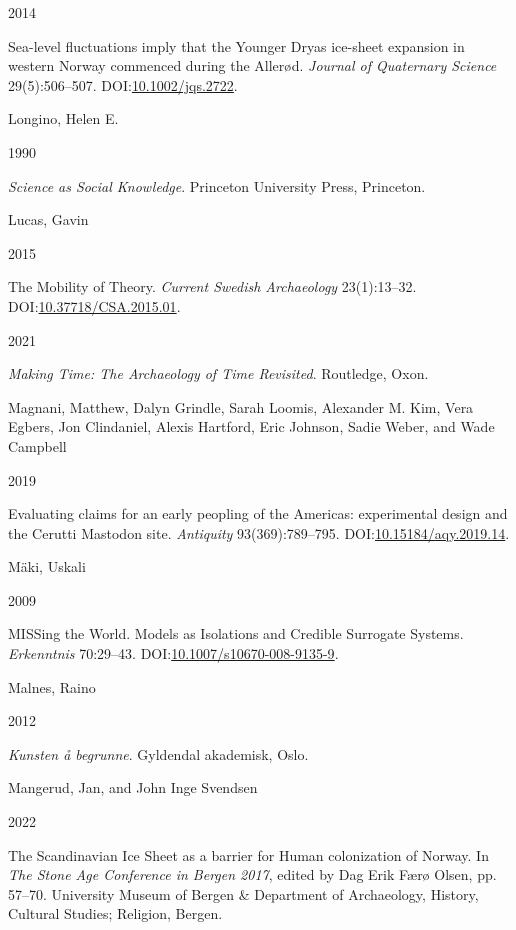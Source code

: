 \documentclass[
  12pt,
  a4paper,
  oneside]{book}
\newlength{\cslhangindent}
\newlength{\csllabelwidth}
\newlength{\cslentryspacingunit} %
\newenvironment{CSLReferences}[2] %
 {%
  \setlength{\parindent}{0pt}
  \ifodd #1
  \let\oldpar\par
  \def\par{\hangindent=\cslhangindent\oldpar}
  \fi
  \setlength{\parskip}{#2\cslentryspacingunit}
 }%
 {}
\newcommand{\CSLBlock}[1]{#1\hfill\break}
\newcommand{\CSLLeftMargin}[1]{\parbox[t]{\csllabelwidth}{#1}}
\newcommand{\CSLRightInline}[1]{\parbox[t]{\linewidth - \csllabelwidth}{#1}\break}
\begin{document}
\begin{CSLReferences}{0}{0}
\leavevmode{}%
\CSLLeftMargin{ 2014 }
\CSLRightInline{{Sea-level fluctuations imply that the Younger Dryas ice-sheet expansion in western Norway commenced during the Allerød}. \emph{Journal of Quaternary Science} 29(5):506--507. DOI:\href{https://doi.org/10.1002/jqs.2722}{10.1002/jqs.2722}.}

\leavevmode{}%
\CSLBlock{Longino, Helen E.}
\CSLLeftMargin{ 1990}
\CSLRightInline{\emph{{Science as Social Knowledge}}. Princeton University Press, Princeton.}

\leavevmode{}%
\CSLBlock{Lucas, Gavin}
\CSLLeftMargin{ 2015}
\CSLRightInline{{The Mobility of Theory}. \emph{Current Swedish Archaeology} 23(1):13--32. DOI:\href{https://doi.org/10.37718/CSA.2015.01}{10.37718/CSA.2015.01}.}

\leavevmode{}%
\CSLLeftMargin{ 2021 }
\CSLRightInline{\emph{{Making Time: The Archaeology of Time Revisited}}. Routledge, Oxon.}

\leavevmode{}%
\CSLBlock{Magnani, Matthew, Dalyn Grindle, Sarah Loomis, Alexander M. Kim, Vera Egbers, Jon Clindaniel, Alexis Hartford, Eric Johnson, Sadie Weber, and Wade Campbell}
\CSLLeftMargin{ 2019}
\CSLRightInline{Evaluating claims for an early peopling of the Americas: experimental design and the Cerutti Mastodon site. \emph{Antiquity} 93(369):789--795. DOI:\href{https://doi.org/10.15184/aqy.2019.14}{10.15184/aqy.2019.14}.}

\leavevmode{}%
\CSLBlock{Mäki, Uskali}
\CSLLeftMargin{ 2009}
\CSLRightInline{{MISSing the World. Models as Isolations and Credible Surrogate Systems}. \emph{Erkenntnis} 70:29--43. DOI:\href{https://doi.org/10.1007/s10670-008-9135-9}{10.1007/s10670-008-9135-9}.}

\leavevmode{}%
\CSLBlock{Malnes, Raino}
\CSLLeftMargin{ 2012}
\CSLRightInline{\emph{{Kunsten å begrunne}}. Gyldendal akademisk, Oslo.}

\leavevmode{}%
\CSLBlock{Mangerud, Jan, and John Inge Svendsen}
\CSLLeftMargin{ 2022}
\CSLRightInline{{The Scandinavian Ice Sheet as a barrier for Human colonization of Norway}. In \emph{{The Stone Age Conference in Bergen 2017}}, edited by Dag Erik Færø Olsen, pp. 57--70. University Museum of Bergen \& Department of Archaeology, History, Cultural Studies; Religion, Bergen.}


\end{CSLReferences}
\end{document}
